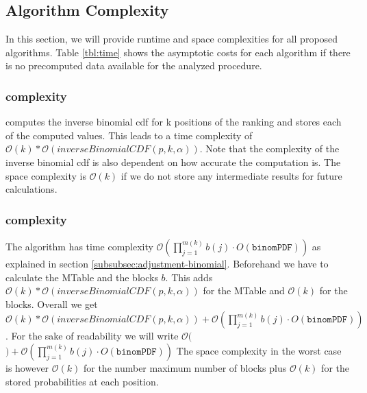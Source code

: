 \subsection{Algorithm Complexity}\label{subsec:algorithm-complexity}
In this section, we will provide runtime and space complexities for all proposed algorithms. Table \ref{tbl:time} shows the asymptotic costs for each algorithm if there is no precomputed data available for the analyzed procedure.
\subsubsection{\algoMtable complexity}\label{subsubsec:construct-mtable-complexity}
\algoMtable computes the inverse binomial cdf for k positions of the ranking and stores each of the computed values. This leads to a time complexity of $\mathcal{O}(k) * \mathcal{O}(inverseBinomialCDF(p,k,\alpha))$. Note that the complexity of the inverse binomial cdf is also dependent on how accurate the computation is. The space complexity is $\mathcal{O}(k)$ if we do not store any intermediate results for future calculations.
\subsubsection{\algoRecursive complexity}\label{subsubsec:success-prob-complexity}
The algorithm \algoRecursive has time complexity $\mathcal{O}(\prod_{j=1}^{m(k)}b(j) \cdot O(\texttt{binomPDF}))$ as explained in section \ref{subsubsec:adjustment-binomial}. Beforehand we have to calculate the MTable and the blocks $b$. This adds $\mathcal{O}(k) * \mathcal{O}(inverseBinomialCDF(p,k,\alpha))$ for the MTable and $\mathcal{O}(k)$ for the blocks. Overall we get $\mathcal{O}(k) * \mathcal{O}(inverseBinomialCDF(p,k,\alpha)) + \mathcal{O}(\prod_{j=1}^{m(k)}b(j) \cdot O(\texttt{binomPDF}))$. For the sake of readability we will write $\mathcal{O}($\algoMtable$) + \mathcal{O}(\prod_{j=1}^{m(k)}b(j) \cdot O(\texttt{binomPDF}))$
The space complexity in the worst case is however $\mathcal{O}(k)$ for the number maximum number of blocks plus $\mathcal{O}(k)$ for the stored probabilities at each position.
